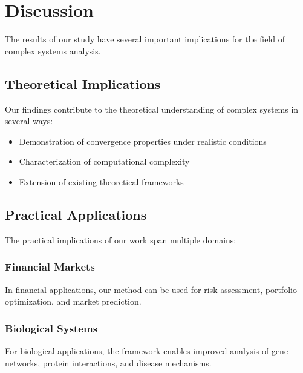 \documentclass[12pt, letterpaper, onecolumn, final]{article}
\theoremstyle{plain}
\theoremstyle{definition}
\theoremstyle{remark}
\begin{document}
\lipsum[42]

\section{Discussion}
\label{sec:discussion}

\lipsum[43-44] The results of our study have several important implications for the field of complex systems analysis.

\subsection{Theoretical Implications}
\label{sec:theoretical-implications}

\lipsum[45] Our findings contribute to the theoretical understanding of complex systems in several ways:

\begin{itemize}
    \item Demonstration of convergence properties under realistic conditions
    \item Characterization of computational complexity
    \item Extension of existing theoretical frameworks
\end{itemize}

\lipsum[46]

\subsection{Practical Applications}
\label{sec:applications}

\lipsum[47-48] The practical implications of our work span multiple domains:

\subsubsection{Financial Markets}
\label{sec:finance-app}

\lipsum[49] In financial applications, our method can be used for risk assessment, portfolio optimization, and market prediction.

\subsubsection{Biological Systems}
\label{sec:bio-app}

\lipsum[50] For biological applications, the framework enables improved analysis of gene networks, protein interactions, and disease mechanisms.
\end{document}
